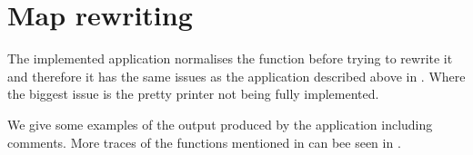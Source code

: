 \section{Map rewriting}
\label{sec:eval-map-rewriting}

The implemented  application normalises the function before
trying to rewrite it and therefore it has the same issues as the
 application described above in
. Where the biggest issue is the pretty
printer not being fully implemented.


We give some examples of the output produced by the  application
including comments. More traces of the functions mentioned in
 can bee seen in
.



